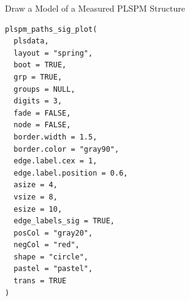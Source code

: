 \documentclass[a4paper]{book}
\begin{document}
%
\begin{Description}
Draw a Model of a Measured PLSPM Structure
\end{Description}
%
\begin{Usage}
\begin{verbatim}
plspm_paths_sig_plot(
  plsdata,
  layout = "spring",
  boot = TRUE,
  grp = TRUE,
  groups = NULL,
  digits = 3,
  fade = FALSE,
  node = FALSE,
  border.width = 1.5,
  border.color = "gray90",
  edge.label.cex = 1,
  edge.label.position = 0.6,
  asize = 4,
  vsize = 8,
  esize = 10,
  edge_labels_sig = TRUE,
  posCol = "gray20",
  negCol = "red",
  shape = "circle",
  pastel = "pastel",
  trans = TRUE
)
\end{verbatim}
\end{Usage}
%
\end{document}
